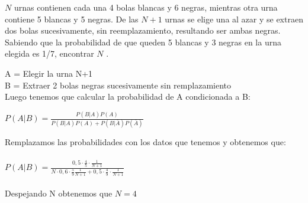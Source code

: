 \problem
$ N $ urnas contienen cada una 4 bolas blancas y 6 negras, mientras otra
urna contiene 5 blancas y 5 negras. De las $ N + 1 $ urnas se elige una al
azar y se extraen dos bolas sucesivamente, sin reemplazamiento,
resultando ser ambas negras. Sabiendo que la probabilidad de que
queden 5 blancas y 3 negras en la urna elegida es 1/7, encontrar $ N $ .
	
A = Elegir la urna N+1 \\
B = Extraer 2 bolas negras sucesivamente sin remplazamiento \\
Luego tenemos que calcular la probabilidad de A condicionada a B:\\
	
\begin{flushleft}
	
		$P(A|B) = \frac{P(B|A)P(A)}{P(B|A)P(A)+P(B|\bar{A})P(\bar{A})} $\\
\end{flushleft}
Remplazamos las probabilidades con los datos que tenemos y obtenemos que: \\ \\
$P(A|B) = \frac{0,5 \cdot \frac{4}{5} \cdot \frac{1}{N+1}}{N\cdot0,6\cdot\frac{5}{9}\frac{1}{N+1} + 0,5\cdot\frac{4}{9}\cdot\frac{1}{N+1}} $\\\\
Despejando N obtenemos que $N=4$
